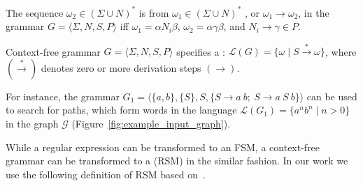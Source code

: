 
\begin{definition}
The sequence $\omega_2 \in (\Sigma \cup N)^*$ is  from $\omega_1 \in (\Sigma \cup N)^*$ , or $\omega_1 \to \omega_2$, in the grammar $G = \langle\Sigma, N, S, P\rangle$ iff $\omega_1=\alpha N_i \beta$, $\omega_2 = \alpha \gamma \beta$, and $N_i \to \gamma \in P$.
\end{definition}

\begin{definition}
Context-free grammar $G=\langle\Sigma, N, S, P\rangle$ specifies a : $\mathcal{L}(G) = \{\omega \mid S \xrightarrow{*} \omega \}$, where $(\xrightarrow{*})$ denotes zero or more derivation steps $(\to)$.
\end{definition}

For instance, the grammar $G_1 = \langle \{a,b\}, \{S\}, S, \{S \to a \ b; \ S \to a \ S \ b\} \rangle$ can be used to search for paths, which form words in the language $\mathcal{L}(G_1) = \{a^n b^n \mid n > 0\}$ in the graph $\mathcal{G}$ (Figure~\ref{fig:example_input_graph}).


While a regular expression can be transformed to an FSM, a context-free grammar can be transformed to a  (RSM) in the similar fashion.
In our work we use the following definition of RSM based
on~\cite{rsm:analysis:10.1007/3-540-44585-4_18}.

